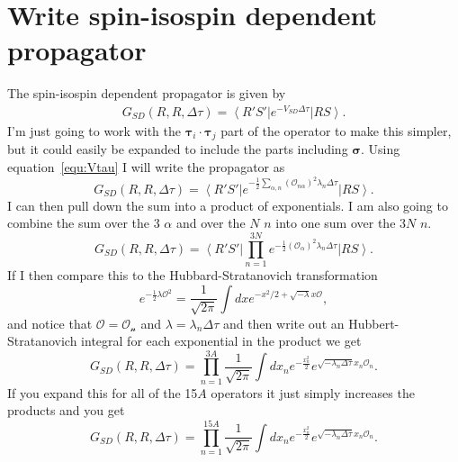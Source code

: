 \documentclass[12pt]{extarticle}
\newcommand{\ket}[1]{\left| #1 \right>}
\newcommand{\bra}[1]{\left< #1 \right|}
\newcommand{\taui}{\bm{\tau}_i}
\newcommand{\tauj}{\bm{\tau}_j}
\newcommand{\dt}{\Delta\tau}
\begin{document}
\section*{Write spin-isospin dependent propagator}
The spin-isospin dependent propagator is given by
\begin{align}
   G_{SD}(R,R,\dt) = \bra{R'S'}e^{-V_{SD}\dt}\ket{RS}.
\end{align}
I'm just going to work with the $\taui\cdot\tauj$ part of the operator to make this simpler, but it could easily be expanded to include the parts including $\mathbf{\sigma}$. Using equation~\ref{equ:Vtau} I will write the propagator as
\begin{equation}
   G_{SD}(R,R,\dt) = \bra{R'S'}e^{-\frac{1}{2}\sum\limits_{\alpha,n}\left(\mathcal{O}_{n\alpha}\right)^2\lambda_n\dt}\ket{RS}.
\end{equation}
I can then pull down the sum into a product of exponentials. I am also going to combine the sum over the 3 $\alpha$ and over the $N$ $n$ into one sum over the $3N$ $n$.
\begin{equation}
   G_{SD}(R,R,\dt) = \bra{R'S'}\prod\limits_{n=1}^{3N}e^{-\frac{1}{2}\left(\mathcal{O}_\alpha\right)^2\lambda_n\dt}\ket{RS}.
\end{equation}
If I then compare this to the Hubbard-Stratanovich transformation
\begin{equation}
   e^{-\frac{1}{2}\lambda\mathcal{O}^2} = \frac{1}{\sqrt{2\pi}}\int dx e^{-x^2/2+\sqrt{-\lambda}x\mathcal{O}},
\end{equation}
and notice that $\mathcal{O}=\mathcal{O_n}$ and $\lambda=\lambda_n\dt$ and then write out an Hubbert-Stratanovich integral for each exponential in the product we get
\begin{equation}
   G_{SD}(R,R,\dt) = \prod\limits_{n=1}^{3A}\frac{1}{\sqrt{2\pi}}\int dx_n e^{-\frac{x_n^2}{2}} e^{\sqrt{-\lambda_n\dt}x_n\mathcal{O}_n}.
\end{equation}
If you expand this for all of the 15$A$ operators it just simply increases the products and you get
\begin{equation}
   G_{SD}(R,R,\dt) = \prod\limits_{n=1}^{15A}\frac{1}{\sqrt{2\pi}}\int dx_n e^{-\frac{x_n^2}{2}} e^{\sqrt{-\lambda_n\dt}x_n\mathcal{O}_n}.
\end{equation}
\end{document}
